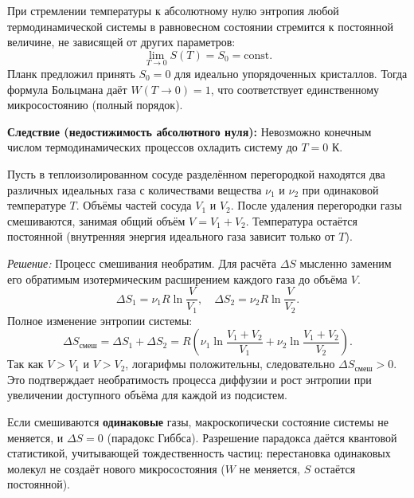 \begin{theorem}
При стремлении температуры к абсолютному нулю энтропия любой термодинамической системы в равновесном состоянии стремится к постоянной величине, не зависящей от других параметров:
\begin{equation}
    \lim_{T \to 0} S(T) = S_0 = \text{const}. \label{eq:nernst_theorem}
\end{equation}
Планк предложил принять $S_0 = 0$ для идеально упорядоченных кристаллов. Тогда формула Больцмана даёт $W(T \to 0) = 1$, что соответствует единственному микросостоянию (полный порядок).
\par\noindent\textbf{Следствие (недостижимость абсолютного нуля):} Невозможно конечным числом термодинамических процессов охладить систему до $T = 0$ К.
\end{theorem}

\begin{example}
Пусть в теплоизолированном сосуде разделённом перегородкой находятся два различных идеальных газа с количествами вещества $\nu_1$ и $\nu_2$ при одинаковой температуре $T$. Объёмы частей сосуда $V_1$ и $V_2$. После удаления перегородки газы смешиваются, занимая общий объём $V = V_1 + V_2$. Температура остаётся постоянной (внутренняя энергия идеального газа зависит только от $T$).
\par\noindent\textit{Решение:} Процесс смешивания необратим. Для расчёта $\Delta S$ мысленно заменим его обратимым изотермическим расширением каждого газа до объёма $V$.
\begin{equation}
    \Delta S_1 = \nu_1 R \ln\frac{V}{V_1}, \quad \Delta S_2 = \nu_2 R \ln\frac{V}{V_2}.
\end{equation}
Полное изменение энтропии системы:
\begin{equation}
    \Delta S_{\text{смеш}} = \Delta S_1 + \Delta S_2 = R \left( \nu_1 \ln\frac{V_1+V_2}{V_1} + \nu_2 \ln\frac{V_1+V_2}{V_2} \right). \label{eq:mixing_entropy}
\end{equation}
Так как $V > V_1$ и $V > V_2$, логарифмы положительны, следовательно $\Delta S_{\text{смеш}} > 0$. Это подтверждает необратимость процесса диффузии и рост энтропии при увеличении доступного объёма для каждой из подсистем.
\end{example}

\begin{remark}
Если смешиваются \textbf{одинаковые} газы, макроскопически состояние системы не меняется, и $\Delta S = 0$ (парадокс Гиббса). Разрешение парадокса даётся квантовой статистикой, учитывающей тождественность частиц: перестановка одинаковых молекул не создаёт нового микросостояния ($W$ не меняется, $S$ остаётся постоянной).
\end{remark}

